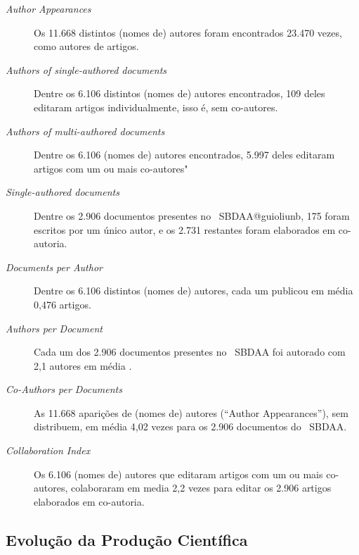 \begin{description}
    \item [\textit{Author Appearances}] Os 11.668 distintos (nomes de) autores foram encontrados 23.470 vezes, como autores de artigos.
    \item [\textit{Authors of single-authored documents}] Dentre os 6.106 distintos (nomes de) autores encontrados, 109 deles editaram artigos individualmente, isso é, sem co-autores.
    \item [\textit{Authors of multi-authored documents}] Dentre os 6.106 (nomes de) autores encontrados, 5.997 deles editaram artigos com um ou mais co-autores"
    \item [\textit{Single-authored documents}] Dentre os 2.906 documentos presentes no \dataset\   SBDAA@guioliunb, 175 foram escritos por um único autor, e os 2.731 restantes foram elaborados em co-autoria.
    \item [\textit{Documents per Author}] Dentre os 6.106 distintos (nomes de) autores, cada um publicou em média 0,476 artigos.
    \item [\textit{Authors per Document}] Cada um dos 2.906 documentos presentes no \dataset\  SBDAA foi autorado com 2,1 autores em média .
    \item [\textit{Co-Authors per Documents}] As 11.668 aparições de (nomes de) autores (``Author Appearances''), sem distribuem, em média 4,02 vezes para os 2.906 documentos do \dataset\  SBDAA.
    \item [\textit{Collaboration Index}] Os 6.106 (nomes de) autores que editaram artigos com um ou mais co-autores, colaboraram em media 2,2 vezes para editar os 2.906 artigos elaborados em co-autoria.
\end{description}

\subsection{Evolução da Produção Científica}

